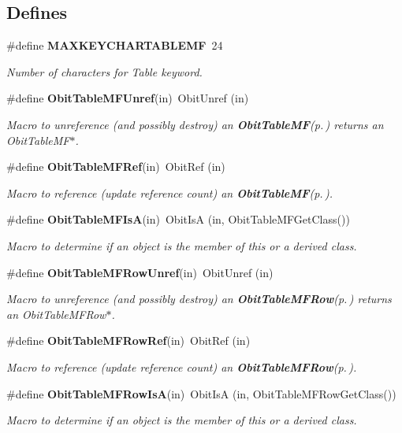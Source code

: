 \subsection*{Defines}
\begin{CompactItemize}
\item 
\#define {\bf MAXKEYCHARTABLEMF}\ 24
\begin{CompactList}\small\item\em Number of characters for Table keyword. \item\end{CompactList}\item 
\#define {\bf Obit\-Table\-MFUnref}(in)\ Obit\-Unref (in)
\begin{CompactList}\small\item\em Macro to unreference (and possibly destroy) an {\bf Obit\-Table\-MF}{\rm (p.\,\pageref{structObitTableMF})} returns an Obit\-Table\-MF$\ast$. \item\end{CompactList}\item 
\#define {\bf Obit\-Table\-MFRef}(in)\ Obit\-Ref (in)
\begin{CompactList}\small\item\em Macro to reference (update reference count) an {\bf Obit\-Table\-MF}{\rm (p.\,\pageref{structObitTableMF})}. \item\end{CompactList}\item 
\#define {\bf Obit\-Table\-MFIs\-A}(in)\ Obit\-Is\-A (in, Obit\-Table\-MFGet\-Class())
\begin{CompactList}\small\item\em Macro to determine if an object is the member of this or a derived class. \item\end{CompactList}\item 
\#define {\bf Obit\-Table\-MFRow\-Unref}(in)\ Obit\-Unref (in)
\begin{CompactList}\small\item\em Macro to unreference (and possibly destroy) an {\bf Obit\-Table\-MFRow}{\rm (p.\,\pageref{structObitTableMFRow})} returns an Obit\-Table\-MFRow$\ast$. \item\end{CompactList}\item 
\#define {\bf Obit\-Table\-MFRow\-Ref}(in)\ Obit\-Ref (in)
\begin{CompactList}\small\item\em Macro to reference (update reference count) an {\bf Obit\-Table\-MFRow}{\rm (p.\,\pageref{structObitTableMFRow})}. \item\end{CompactList}\item 
\#define {\bf Obit\-Table\-MFRow\-Is\-A}(in)\ Obit\-Is\-A (in, Obit\-Table\-MFRow\-Get\-Class())
\begin{CompactList}\small\item\em Macro to determine if an object is the member of this or a derived class. \item\end{CompactList}\end{CompactItemize}
